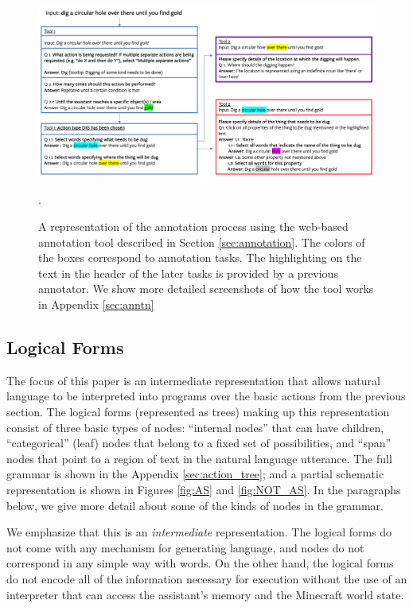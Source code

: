 \begin{figure}
\center
 \includegraphics[width=\linewidth, height=6 cm  ]{figures/tools_diagram2.png}
 \caption{A representation of the annotation process using the web-based annotation tool described in Section \ref{sec:annotation}.  The colors of the boxes correspond to annotation tasks.  The highlighting on the text in the header of the later tasks is provided by a previous annotator.  We show more detailed screenshots of how the tool works in  Appendix \ref{sec:anntn}}.
\label{fig:tool}
\end{figure}

\subsection{Logical Forms}
The focus of this paper is an intermediate representation that allows natural language to be interpreted into programs over the basic actions from the previous section. 
The logical forms (represented as trees) making up this representation consist of three basic types of nodes: ``internal nodes'' that can have children, ``categorical'' (leaf) nodes that belong to a fixed set of possibilities, and ``span'' nodes that point to a region of text in the natural language utterance.   The full grammar is shown in the Appendix \ref{sec:action_tree}; and a partial schematic representation is shown in Figures \ref{fig:AS} and \ref{fig:NOT_AS}.  In the paragraphs below, we give more detail about some of the kinds of nodes in the grammar.     

We emphasize that this is an {\it intermediate} representation.   The logical forms do not come with any mechanism for generating language, and nodes do not correspond in any simple way with words.  On the other hand, the logical forms do not encode all of the information necessary for execution without the use of an interpreter that can access the assistant's memory and the Minecraft world state.   

